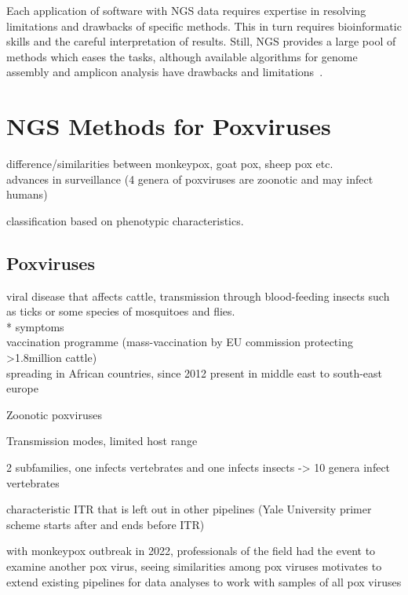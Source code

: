 Each application of software with NGS data requires expertise in resolving limitations and drawbacks of specific methods. This in turn requires bioinformatic skills and the careful interpretation of results. Still, NGS provides a large pool of methods which eases the tasks, although available algorithms for genome assembly and amplicon analysis have drawbacks and limitations~\cite{finotello2012comparative}.


\section{NGS Methods for Poxviruses}

difference/similarities between monkeypox, goat pox, sheep pox etc. \\
advances in surveillance (4 genera of poxviruses are zoonotic and may infect humans)

classification based on phenotypic characteristics.

\subsection{Poxviruses}
viral disease that affects cattle, transmission through blood-feeding insects such as ticks or some species of mosquitoes and flies. \\
* symptoms \\
vaccination programme (mass-vaccination by EU commission protecting >1.8million cattle)\\
spreading in African countries, since 2012 present in middle east to south-east europe

Zoonotic poxviruses

Transmission modes, limited host range 

2 subfamilies, one infects vertebrates and one infects insects
-> 10 genera infect vertebrates

characteristic ITR that is left out in other pipelines (Yale University primer scheme starts after and ends before ITR)

with monkeypox outbreak in 2022, professionals of the field had the event to examine another pox virus, seeing similarities among pox viruses motivates to extend existing pipelines for data analyses to work with samples of all pox viruses

